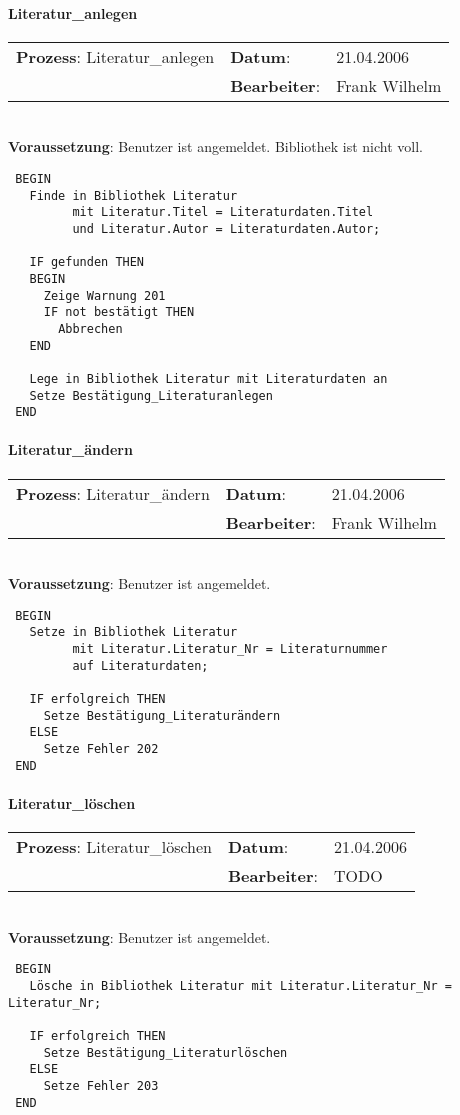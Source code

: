\paragraph{Literatur\_anlegen}
\begin{tabular}[t]{p{9.5cm}ll}
\textbf{Prozess}: Literatur\_anlegen  	&\textbf{Datum}:      &21.04.2006\\
					&\textbf{Bearbeiter}: &Frank Wilhelm\\
\end{tabular}

\hrulefill\\
\textbf{Voraussetzung}: Benutzer ist angemeldet. Bibliothek ist nicht voll.
\begin{verbatim}
 BEGIN
   Finde in Bibliothek Literatur
         mit Literatur.Titel = Literaturdaten.Titel
         und Literatur.Autor = Literaturdaten.Autor;
 
   IF gefunden THEN
   BEGIN
     Zeige Warnung 201
     IF not bestätigt THEN
       Abbrechen
   END
   
   Lege in Bibliothek Literatur mit Literaturdaten an
   Setze Bestätigung_Literaturanlegen
 END
\end{verbatim}
\hrulefill



\paragraph{Literatur\_ändern}
\begin{tabular}[t]{p{9.5cm}ll}
\textbf{Prozess}: Literatur\_ändern  	&\textbf{Datum}:      &21.04.2006\\
					&\textbf{Bearbeiter}: &Frank Wilhelm\\
\end{tabular}

\hrulefill\\
\textbf{Voraussetzung}: Benutzer ist angemeldet.
\begin{verbatim}
 BEGIN
   Setze in Bibliothek Literatur
         mit Literatur.Literatur_Nr = Literaturnummer
         auf Literaturdaten;
  
   IF erfolgreich THEN
     Setze Bestätigung_Literaturändern
   ELSE
     Setze Fehler 202
 END
\end{verbatim}
\hrulefill



\paragraph{Literatur\_löschen}
\begin{tabular}[t]{p{9.5cm}ll}
\textbf{Prozess}: Literatur\_löschen  	&\textbf{Datum}:      &21.04.2006\\
					&\textbf{Bearbeiter}: &TODO\\
\end{tabular}

\hrulefill\\
\textbf{Voraussetzung}: Benutzer ist angemeldet.
\begin{verbatim}
 BEGIN
   Lösche in Bibliothek Literatur mit Literatur.Literatur_Nr = Literatur_Nr;
   
   IF erfolgreich THEN
     Setze Bestätigung_Literaturlöschen
   ELSE
     Setze Fehler 203
 END
\end{verbatim}
\hrulefill